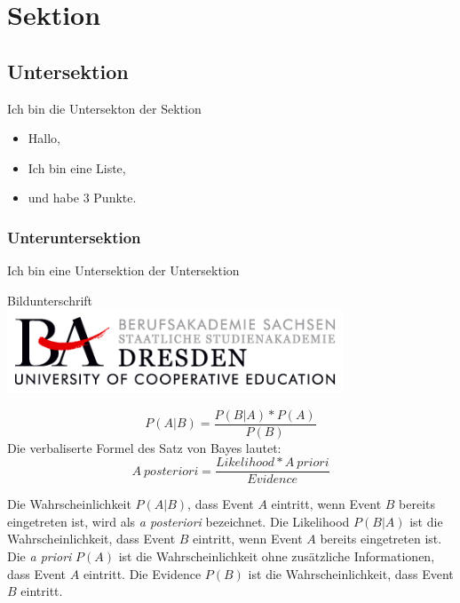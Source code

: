 \section{Sektion}

\subsection{Untersektion}
Ich bin die Untersekton der Sektion

\begin{itemize}
    \item Hallo,
    \item Ich bin eine Liste,
    \item und habe 3 Punkte.
\end{itemize}

\subsubsection{Unteruntersektion}
Ich bin eine Untersektion der Untersektion

\begin{bafigure}
    [placement = h!, source = https://google.com]
    {Bildunterschrift}        
    \includegraphics[width=10cm]{./graphics/ba.png}    
\end{bafigure}

\begin{equation*}
    P(A|B) = \frac{P(B|A) * P(A)}{P(B)}
\end{equation*}
Die verbaliserte Formel des Satz von Bayes lautet:
\begin{equation*}
    A~posteriori = \frac{Likelihood * A~priori}{Evidence}
\end{equation*}

Die Wahrscheinlichkeit $P(A|B)$, dass Event $A$ eintritt, wenn Event $B$ bereits eingetreten ist,
wird als \textit{a posteriori} bezeichnet. Die Likelihood $P(B|A)$ ist die Wahrscheinlichkeit,
dass Event $B$ eintritt, wenn Event $A$ bereits eingetreten ist.
Die \textit{a priori} $P(A)$ ist die Wahrscheinlichkeit ohne zusätzliche Informationen,
dass Event $A$ eintritt. Die Evidence $P(B)$ ist die Wahrscheinlichkeit,
dass Event $B$ eintritt.



